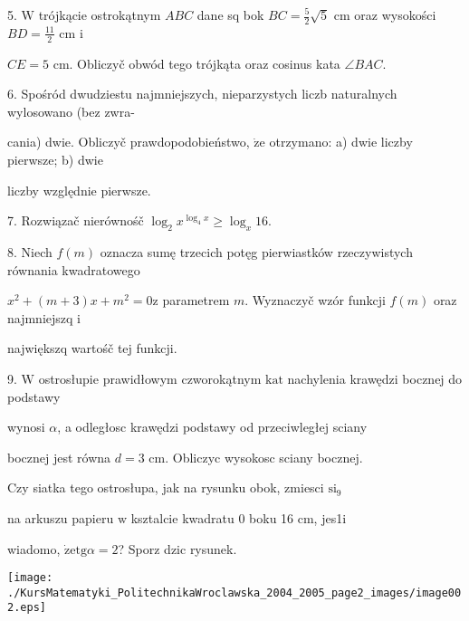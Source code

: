 \documentclass[a4paper,12pt]{article}
\begin{document}
5. $\mathrm{W}$ trójkącie ostrokątnym $ABC$ dane sq bok $BC=\displaystyle \frac{5}{2}\sqrt{5}$ cm oraz wysokości $BD=\displaystyle \frac{11}{2}$ cm $\mathrm{i}$

$CE=5$ cm. Obliczyč obwód tego trójkąta oraz cosinus kata $\angle BAC.$

6. Spośród dwudziestu najmniejszych, nieparzystych liczb naturalnych wylosowano (bez zwra-

cania) dwie. Obliczyč prawdopodobieństwo, $\dot{\mathrm{z}}\mathrm{e}$ otrzymano: a) dwie liczby pierwsze; b) dwie

liczby względnie pierwsze.

7. Rozwiązač nierównośč $\log_{2} x^{\log_{4}x}\geq\log_{x}16.$

8. Niech $f(m)$ oznacza sumę trzecich potęg pierwiastków rzeczywistych równania kwadratowego

$x^{2}+(m+3)x+m^{2}=0\mathrm{z}$ parametrem $m$. Wyznaczyč wzór funkcji $f(m)$ oraz najmniejszq $\mathrm{i}$

największq wartośč tej funkcji.

9. $\mathrm{W}$ ostrosłupie prawidłowym czworokątnym $\mathrm{k}\mathrm{a}\mathrm{t}$ nachylenia krawędzi bocznej do podstawy

wynosi $\alpha$, a odległosc krawędzi podstawy od przeciwległej sciany

bocznej jest równa $d=3$ cm. Obliczyc wysokosc sciany bocznej.

Czy siatka tego ostrosłupa, jak na rysunku obok, zmiesci $\mathrm{s}\mathrm{i}_{9}$

na arkuszu papieru $\mathrm{w}$ ksztalcie kwadratu $0$ boku 16 cm, jes1i

wiadomo, $\dot{\mathrm{z}}\mathrm{e}\mathrm{t}\mathrm{g}\alpha=2$? Sporz dzic rysunek.
\begin{center}
\texttt{[image: ./KursMatematyki\_PolitechnikaWroclawska\_2004\_2005\_page2\_images/image002.eps]}
\end{center}
\end{document}
